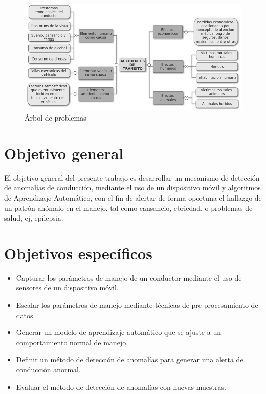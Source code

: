 \begin{figure}[h!]
  \begin{center}	\includegraphics[width=1.0\textwidth, fbox]{imagenes/Cap1/arbol_p}
  \caption{\'{A}rbol de problemas}
  \label{fig:arbol}
  \end{center}
\end{figure}


\section{Objetivo general}

El objetivo general del presente trabajo es desarrollar un mecanismo de detecci\'{o}n de anomal\'{i}as de conducción, mediante el uso de un dispositivo móvil y algoritmos de Aprendizaje Automático, con el fin de alertar de forma oportuna el hallazgo de un patrón anómalo en el manejo, tal como cansancio, ebriedad, o problemas de salud, ej, epilepsia.

\section{Objetivos específicos}
\begin{itemize}

\item Capturar los parámetros de manejo de un conductor mediante el uso de sensores de un dispositivo móvil.
\item Escalar los parámetros de manejo mediante técnicas de pre-procesamiento de datos.
\item Generar un modelo de aprendizaje automático que se ajuste a un comportamiento normal de manejo.
\item Definir un método de detección de anomalías para generar una alerta de conducción anormal.
\item Evaluar el método de detección de anomalías con nuevas muestras.

\end{itemize}


